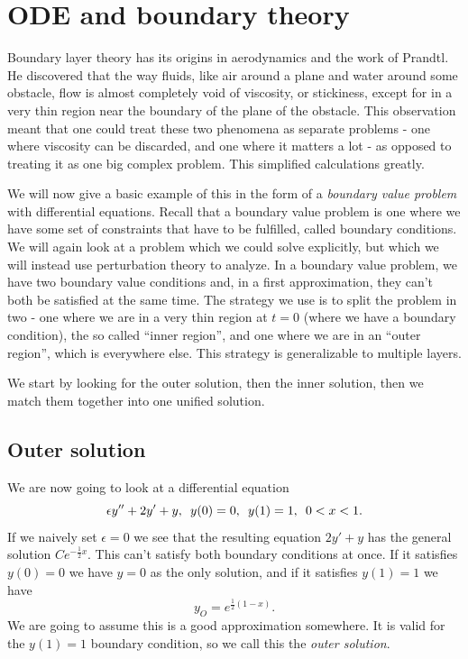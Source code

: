 \documentclass[12pt]{article}
\begin{document}
\newpage
\section{ODE and boundary theory}

Boundary layer theory has its origins in aerodynamics and the work of
Prandtl. He discovered that the way fluids, like air around a plane
and water around some obstacle, flow is almost completely void of
viscosity, or stickiness, except for in a very thin region near the
boundary of the plane of the obstacle. This observation meant that one
could treat these two phenomena as separate problems - one where
viscosity can be discarded, and one where it matters a lot - as
opposed to treating it as one big complex problem. This simplified
calculations greatly.

We will now give a basic example of this in the form of a
\textit{boundary value problem} with differential equations. Recall
that a boundary value problem is one where we have some set of
constraints that have to be fulfilled, called boundary conditions. We
will again look at a problem which we could solve explicitly, but
which we will instead use perturbation theory to analyze. In a
boundary value problem, we have two boundary value conditions and, in
a first approximation, they can't both be satisfied at the same
time. The strategy we use is to split the problem in two - one where
we are in a very thin region at $t=0$ (where we have a boundary
condition), the so called ``inner region'', and one where we are in an
``outer region'', which is everywhere else. This strategy is
generalizable to multiple layers.

We start by looking for the outer solution, then the inner solution,
then we match them together into one unified solution.

\subsection{Outer solution}

We are now going to look at a differential equation
\begin{equation}
\epsilon y'' + 2 y' + y, \enskip y(0)=0, \enskip y(1)=1, \enskip 0 < x < 1.
\end{equation}
If we naively set $\epsilon = 0$ we see that the resulting equation $2 y' + y$
has the general solution $C e^{- \frac{1}{2}x}$. This can't satisfy both
boundary conditions at once. If it satisfies $y(0)=0$ we have $y=0$ as the only
solution, and if it satisfies $y(1)=1$ we have
\begin{equation}
y_O=e^{\frac{1}{2} (1 - x)}.
\end{equation}
We are going to assume this is a good approximation somewhere. It is
valid for the $y(1)=1$ boundary condition, so we call this the
\textit{outer solution}.
\end{document}
